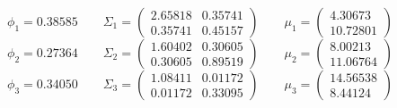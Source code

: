\documentclass[parskip=half,a4paper]{scrartcl}
\begin{document}
$$
\phi_1 = 0.38585\qquad\Sigma_1 = \begin{pmatrix}2.65818&0.35741\\0.35741&0.45157\end{pmatrix}\qquad\mu_1 = \begin{pmatrix}4.30673\\10.72801\end{pmatrix}
$$
$$
\phi_2 = 0.27364\qquad\Sigma_2 = \begin{pmatrix}1.60402&0.30605\\0.30605&0.89519\end{pmatrix}\qquad\mu_2 = \begin{pmatrix}8.00213\\11.06764\end{pmatrix}
$$
$$
\phi_3 = 0.34050\qquad\Sigma_3 = \begin{pmatrix}1.08411&0.01172\\0.01172&0.33095\end{pmatrix}\qquad\mu_3 = \begin{pmatrix}14.56538\\8.44124\end{pmatrix}
$$
\end{document}
